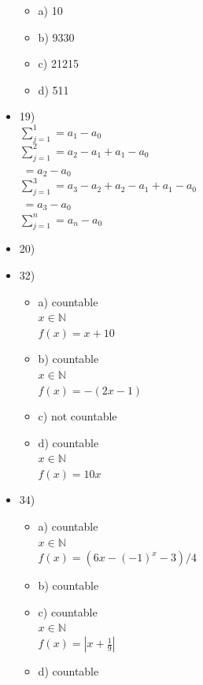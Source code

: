 \documentclass{article}
\begin{document}
\begin{itemize}
\begin{itemize}
      \item
        a) 10
      \item
        b) 9330
      \item
        c) 21215
      \item
        d) 511
    \end{itemize}
	\item
		19)\\
    $\sum_{j=1}^{1}=a_{1}-a_{0}$\\
    $\sum_{j=1}^{2}=a_{2}-a_{1}+a_{1}-a_{0}$\\ $\;=a_{2}-a_{0}$\\
    $\sum_{j=1}^{3}=a_{3}-a_{2}+a_{2}-a_{1}+a_{1}-a_{0}$\\ $\;=a_{3}-a_{0}$\\
    $\sum_{j=1}^{n}=a_{n}-a_{0}$
	\item
		20)
	\item
		32)
    \begin{itemize}
      \item
        a) countable\\
        $x\in \mathbb{N}$\\
        $f(x)=x+10$
      \item
        b) countable\\
        $x\in \mathbb{N}$\\
        $f(x)=-(2x-1)$
      \item
        c) not countable
      \item
        d) countable\\
        $x\in \mathbb{N}$\\
        $f(x)=10x$
    \end{itemize}
	\item
		34)
    \begin{itemize}
      \item
        a) countable\\
        $x\in \mathbb{N}$\\
        $f(x)=(6x-(-1)^{x}-3)/4$
      \item
        b) countable\\
        
      \item
        c) countable\\
        $x\in \mathbb{N}$\\
        $f(x)=|x+\frac{1}{9}| $
      \item
        d) countable 
    \end{itemize}
\end{itemize}
\end{document}
